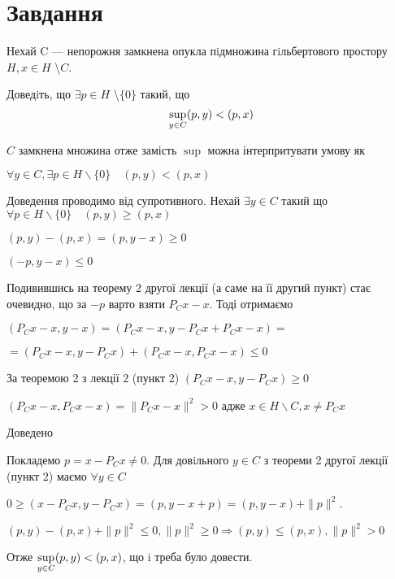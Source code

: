 
\chapter{Завдання \theHchapter}


\begin{tcolorbox}[title=Завдання]
    
    Нехай C — непорожня замкнена опукла пiдмножина гiльбертового 
    простору $ H, x \in H $ \textbackslash $C $.
    
    
    Доведiть, що $ \exists p \in H$ \textbackslash $\{0\} $ такий, що
    $$ \displaystyle\sup_{y \in C} (p, y) < (p, x) $$

    
\end{tcolorbox}




$ C $ замкнена множина отже замість $\sup$ можна інтерпритувати умову як

$\forall y \in C, \exists p \in H \backslash \{0\} \quad 
(p, y) < (p,x) $


Доведення проводимо від супротивного. Нехай $\exists y \in C$ такий що
$\forall p \in H \backslash \{0\} \quad (p, y) \geq (p, x)$


$ (p, y) - (p, x) = (p, y - x) \geq 0 $


$ (-p, y - x) \le 0 $


Подивившись на теорему 2 другої лекції (а саме на її другий пункт)
стає очевидно, що за $-p$ варто взяти $P_Cx - x$.
Тоді отримаємо 


$ (P_Cx - x, y - x) = (P_Cx - x, y - P_Cx + P_Cx - x) = $


$=(P_Cx - x, y - P_Cx) +(P_Cx - x, P_Cx - x) \le 0 $


За теоремою 2 з лекції 2 (пункт 2) $(P_Cx - x, y - P_Cx) \geq 0 $ 


$(P_Cx - x, P_Cx - x) = \|P_Cx - x\|^2 > 0$ адже $x \in H \backslash C,
x \neq P_Cx$


Доведено 







Покладемо $p = x - P_C x \neq 0$. Для довiльного $y \in C$ 
з теореми 2 другої лекції (пункт 2) маємо $ \forall y \in C $


$0 \geq (x - P_C x, y - P_C x)=(p, y - x + p)=(p, y - x) + \|p\| ^2$.


$(p, y) - (p, x) + \|p\| ^2 \le 0, \|p\| ^ 2 \geq 0 \Rightarrow 
(p, y) \le (p, x), \|p\| ^ 2 > 0 $ 


Отже $ \displaystyle\sup_{y \in C} (p, y) < (p, x) $,
що i треба було довести.

